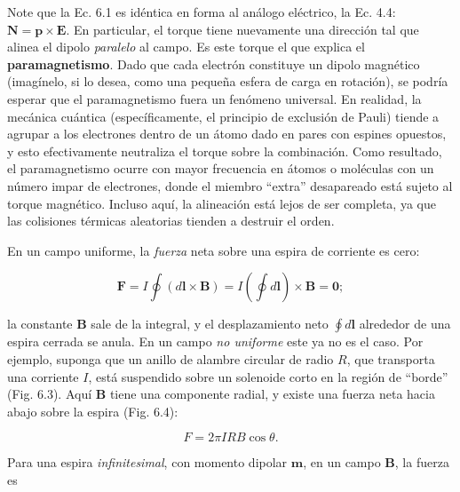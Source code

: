\documentclass[12pt,a4paper]{report}
\newcommand{\esp}{\vspace{0.5cm}}
\begin{document}
	\esp
	
	Note que la Ec. 6.1 es idéntica en forma al análogo eléctrico, la Ec. 4.4: $\mathbf{N} = \mathbf{p} \times \mathbf{E}$. En particular, el torque tiene nuevamente una dirección tal que alinea el dipolo \textit{paralelo} al campo. Es este torque el que explica el \textbf{paramagnetismo}. Dado que cada electrón constituye un dipolo magnético (imagínelo, si lo desea, como una pequeña esfera de carga en rotación), se podría esperar que el paramagnetismo fuera un fenómeno universal. En realidad, la mecánica cuántica (específicamente, el principio de exclusión de Pauli) tiende a agrupar a los electrones dentro de un átomo dado en pares con espines opuestos, y esto efectivamente neutraliza el torque sobre la combinación. Como resultado, el paramagnetismo ocurre con mayor frecuencia en átomos o moléculas con un número impar de electrones, donde el miembro ``extra'' desapareado está sujeto al torque magnético. Incluso aquí, la alineación está lejos de ser completa, ya que las colisiones térmicas aleatorias tienden a destruir el orden.
	
	\esp
	
	En un campo uniforme, la \textit{fuerza} neta sobre una espira de corriente es cero:
	
	\esp
	
	\begin{equation*}
		\mathbf{F} = I \oint (d\mathbf{l} \times \mathbf{B}) = I \left( \oint d\mathbf{l} \right) \times \mathbf{B} = \mathbf{0};
	\end{equation*}
	
	\esp
	
	\noindent la constante $\mathbf{B}$ sale de la integral, y el desplazamiento neto $\oint d\mathbf{l}$ alrededor de una espira cerrada se anula. En un campo \textit{no uniforme} este ya no es el caso. Por ejemplo, suponga que un anillo de alambre circular de radio $R$, que transporta una corriente $I$, está suspendido sobre un solenoide corto en la región de ``borde'' (Fig. 6.3). Aquí $\mathbf{B}$ tiene una componente radial, y existe una fuerza neta hacia abajo sobre la espira (Fig. 6.4):
	
	\esp
	
	\begin{equation}
		F = 2\pi I R B \cos \theta. \tag{6.2}
	\end{equation}
	
	\esp
	
	Para una espira \textit{infinitesimal}, con momento dipolar $\mathbf{m}$, en un campo $\mathbf{B}$, la fuerza es
	
\end{document}
